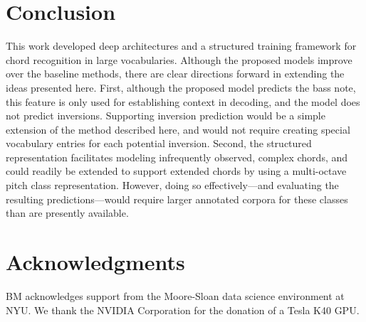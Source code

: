 \documentclass{article}
\begin{document}
\section{Conclusion}
This work developed deep architectures and a structured training framework for chord recognition in large vocabularies.
Although the proposed models improve over the baseline methods, there are clear directions forward in extending the ideas presented here.
First, although the proposed model predicts the bass note, this feature is only used for establishing context in decoding, and the model does not predict inversions.
Supporting inversion prediction would be a simple extension of the method described here, and would not require creating special vocabulary entries for each potential inversion.
Second, the structured representation facilitates modeling infrequently observed, complex chords, and could readily be extended to support extended chords by using a multi-octave pitch class representation.
However, doing so effectively---and evaluating the resulting predictions---would require larger annotated corpora for these classes than are presently available.

%       


\section{Acknowledgments}
BM acknowledges support from the Moore-Sloan data science environment at NYU.
We thank the NVIDIA Corporation for the donation of a Tesla K40 GPU.


\end{document}
